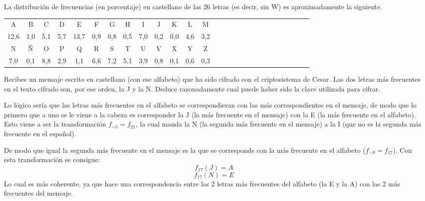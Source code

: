 \begin{problem}[4]
	La distribución de frecuencias (en porcentaje) en castellano de las 26 letras (es decir, sin W) es aproximadamente la siguiente.

	\begin{tabular}{c c c c c c c c c c c c c c c c c c c c c c c c c c c}
		A & B & C & D & E & F & G & H & I & J & K & L & M \\
		12,6 & 1,0 & 5,1 & 5,7 & 13,7 & 0,9 & 0,8 & 0,5 & 7,0 & 0,2 & 0,0 & 4,6 & 3,2 \\
		N & Ñ & O & P & Q & R & S & T & U & V & X & Y & Z \\
		7,0 & 0,1 & 8,8 & 2,9 & 1,1 & 6,6 & 7,2 & 5,1 & 3,9 & 0,8 & 0,1 & 0,6 & 0,3
	\end{tabular}

	Recibes un mensaje escrito en castellano (con ese alfabeto) que ha sido cifrado con el criptosistema de Cesar. Las dos letras más frecuentes en el texto cifrado son, por ese orden, la J y la N. Deduce razonadamente cual puede haber sido la clave utilizada para cifrar.

	\solution

	Lo lógico sería que las letras más frecuentes en el alfabeto se correspondieran con las más correspondientes en el mensaje, de modo que lo primero que a uno se le viene a la cabeza es corresponder la J (la más frecuente en el mensaje) con la E (la más frecuente en el alfabeto). Esto viene a ser la transformación $f_{-5}=f_{21}$, la cual manda la N (la segunda más frecuente en el mensaje) a la I (que no es la segunda más frecuente en el español).

	De modo que igual la segunda más frecuente en el mensaje es la que se corresponde con la más frecuente en el alfabeto ($f_{-9}=f_{17}$). Con esta transformación se consigue:
	\[f_{17}(J)=A\]
	\[f_{17}(N)=E\]
	Lo cual es más coherente, ya que hace una correspondencia entre las 2 letras más frecuentes del alfabeto (la E y la A) con las 2 más frecuentes del mensaje.
\end{problem}

